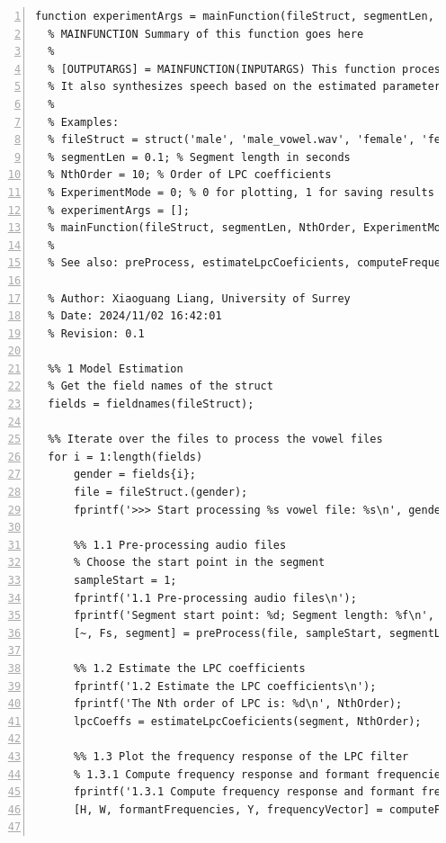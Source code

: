 \documentclass{article}
\begin{document}
\begin{lstlisting}[frame=single, numbers=left, style=Matlab-editor, caption={mainFunction.m}, label={lst:mainFunction}]
  function experimentArgs = mainFunction(fileStruct, segmentLen, NthOrder, ExperimentMode, experimentArgs)
  % MAINFUNCTION Summary of this function goes here
  %
  % [OUTPUTARGS] = MAINFUNCTION(INPUTARGS) This function processes vowel files to estimate LPC coefficients, formant frequencies, and the mean fundamental frequency.
  % It also synthesizes speech based on the estimated parameters and saves the results.
  %
  % Examples:
  % fileStruct = struct('male', 'male_vowel.wav', 'female', 'female_vowel.wav');
  % segmentLen = 0.1; % Segment length in seconds
  % NthOrder = 10; % Order of LPC coefficients
  % ExperimentMode = 0; % 0 for plotting, 1 for saving results
  % experimentArgs = [];
  % mainFunction(fileStruct, segmentLen, NthOrder, ExperimentMode, experimentArgs);
  %
  % See also: preProcess, estimateLpcCoeficients, computeFrequencyResponse, estimateFirstThreeFormant, plotFrequencyResponse, estimateMeanFundamentalFrequency, speechSynthesis
  
  % Author: Xiaoguang Liang, University of Surrey
  % Date: 2024/11/02 16:42:01
  % Revision: 0.1
  
  %% 1 Model Estimation
  % Get the field names of the struct
  fields = fieldnames(fileStruct);
  
  %% Iterate over the files to process the vowel files
  for i = 1:length(fields)
      gender = fields{i};
      file = fileStruct.(gender);
      fprintf('>>> Start processing %s vowel file: %s\n', gender, file);
  
      %% 1.1 Pre-processing audio files
      % Choose the start point in the segment
      sampleStart = 1;
      fprintf('1.1 Pre-processing audio files\n');
      fprintf('Segment start point: %d; Segment length: %f\n', sampleStart, segmentLen);
      [~, Fs, segment] = preProcess(file, sampleStart, segmentLen);
  
      %% 1.2 Estimate the LPC coefficients
      fprintf('1.2 Estimate the LPC coefficients\n');
      fprintf('The Nth order of LPC is: %d\n', NthOrder);
      lpcCoeffs = estimateLpcCoeficients(segment, NthOrder);
  
      %% 1.3 Plot the frequency response of the LPC filter
      % 1.3.1 Compute frequency response and formant frequencies
      fprintf('1.3.1 Compute frequency response and formant frequencies\n');
      [H, W, formantFrequencies, Y, frequencyVector] = computeFrequencyResponse(lpcCoeffs, segment, Fs);
  

\end{lstlisting}
\end{document}

